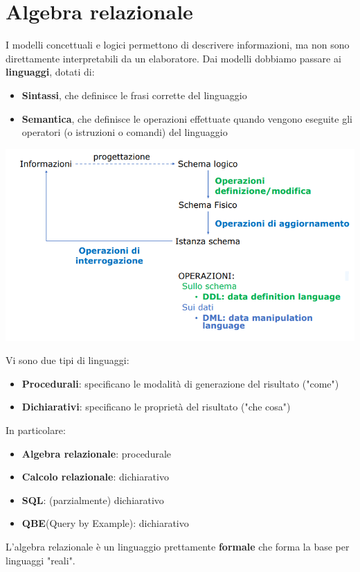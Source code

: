 \documentclass[12pt]{article}
\begin{document}
\section{Algebra relazionale}
I modelli concettuali e logici permettono di descrivere informazioni, ma non sono direttamente interpretabili da un elaboratore.
Dai modelli dobbiamo passare ai \textbf{linguaggi}, dotati di:
\begin{itemize}
    \item \textbf{Sintassi}, che definisce le frasi corrette del linguaggio
    \item \textbf{Semantica}, che definisce le operazioni effettuate quando vengono eseguite gli operatori (o istruzioni o comandi) del linguaggio
\end{itemize}
\begin{center}
    \includegraphics[width = 1\textwidth]{Images/123.PNG}
\end{center}
\newpage
\noindent
Vi sono due tipi di linguaggi:
\begin{itemize}
    \item \textbf{Procedurali}: specificano le modalità di generazione del risultato ("come")
    \item \textbf{Dichiarativi}: specificano le proprietà del risultato ("che cosa")
\end{itemize}
In particolare:
\begin{itemize}
    \item \textbf{Algebra relazionale}: procedurale
    \item \textbf{Calcolo relazionale}: dichiarativo
    \item \textbf{SQL}: (parzialmente) dichiarativo
    \item \textbf{QBE}(Query by Example): dichiarativo
\end{itemize}
L'algebra relazionale è un linguaggio prettamente \textbf{formale} che forma la base per linguaggi "reali".
\end{document}
